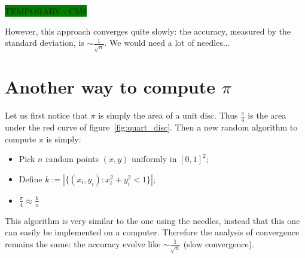 \colorbox{green}{TEMPORARY - CM8}

However, this approach converges quite slowly: the accuracy, measured by the standard deviation, is $\sim \frac{1}{\sqrt{n}}$. We would need a lot of needles...

\section[Another way to compute  \texorpdfstring{$\pi$}{pi}]{Another way to compute $\pi$}

Let us first notice that $\pi$ is simply the area of a unit disc. Thus $\frac{\pi}{4}$ is the area under the red curve of figure~\ref{fig:quart_disc}. Then a new random algorithm to compute $\pi$ is simply:
\begin{itemize}
	\item Pick $n$ random points $(x,y)$ uniformly in $[0,1]^2$;
	\item Define $k:=|\{(x_i,y_i):x_i^2+y_i^2<1\}|$;
	\item $\frac{\pi}{4}\approx \frac{k}{n}$
\end{itemize}

This algorithm is very similar to the one using the needles, instead that this one can easily be implemented on a computer. Therefore the analysis of convergence remains the same: the accuracy evolve like $\sim \frac{1}{\sqrt{n}}$ (slow convergence).

\begin{figure}[h!]%
    \centering
    ~
		\\
		\caption{} 
		\label{fig:compute_pi}
\end{figure}

